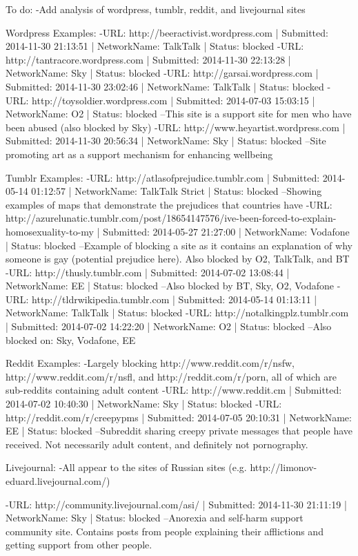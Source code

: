 \documentclass{bmcart}
\begin{document}
To do:
-Add analysis of wordpress, tumblr, reddit, and livejournal sites

Wordpress Examples:
-URL: http://beeractivist.wordpress.com | Submitted: 2014-11-30 21:13:51 | NetworkName: TalkTalk | Status: blocked
-URL: http://tantracore.wordpress.com | Submitted: 2014-11-30 22:13:28 | NetworkName: Sky | Status: blocked
-URL: http://garsai.wordpress.com | Submitted: 2014-11-30 23:02:46 | NetworkName: TalkTalk | Status: blocked
-URL: http://toysoldier.wordpress.com | Submitted: 2014-07-03 15:03:15 | NetworkName: O2 | Status: blocked
--This site is a support site for men who have been abused (also blocked by Sky)
-URL: http://www.heyartist.wordpress.com | Submitted: 2014-11-30 20:56:34 | NetworkName: Sky | Status: blocked
--Site promoting art as a support mechanism for enhancing wellbeing

Tumblr Examples:
-URL: http://atlasofprejudice.tumblr.com | Submitted: 2014-05-14 01:12:57 | NetworkName: TalkTalk Strict | Status: blocked
--Showing examples of maps that demonstrate the prejudices that countries have
-URL: http://azurelunatic.tumblr.com/post/18654147576/ive-been-forced-to-explain-homosexuality-to-my | Submitted: 2014-05-27 21:27:00 | NetworkName: Vodafone | Status: blocked
--Example of blocking a site as it contains an explanation of why someone is gay (potential prejudice here). Also blocked by O2, TalkTalk, and BT
-URL: http://thusly.tumblr.com | Submitted: 2014-07-02 13:08:44 | NetworkName: EE | Status: blocked
--Also blocked by BT, Sky, O2, Vodafone
-URL: http://tldrwikipedia.tumblr.com | Submitted: 2014-05-14 01:13:11 | NetworkName: TalkTalk | Status: blocked
-URL: http://notalkingplz.tumblr.com | Submitted: 2014-07-02 14:22:20 | NetworkName: O2 | Status: blocked
--Also blocked on: Sky, Vodafone, EE


Reddit Examples:
-Largely blocking http://www.reddit.com/r/nsfw, http://www.reddit.com/r/nsfl, and http://reddit.com/r/porn, all of which are sub-reddits containing adult content
-URL: http://www.reddit.cm | Submitted: 2014-07-02 10:40:30 | NetworkName: Sky | Status: blocked
-URL: http://reddit.com/r/creepypms | Submitted: 2014-07-05 20:10:31 | NetworkName: EE | Status: blocked
--Subreddit sharing creepy private messages that people have received. Not necessarily adult content, and definitely not pornography.


Livejournal:
-All appear to the sites of Russian sites (e.g. http://limonov-eduard.livejournal.com/)

-URL: http://community.livejournal.com/asi/ | Submitted: 2014-11-30 21:11:19 | NetworkName: Sky | Status: blocked
--Anorexia and self-harm support community site. Contains posts from people explaining their afflictions and getting support from other people.
\end{document}
